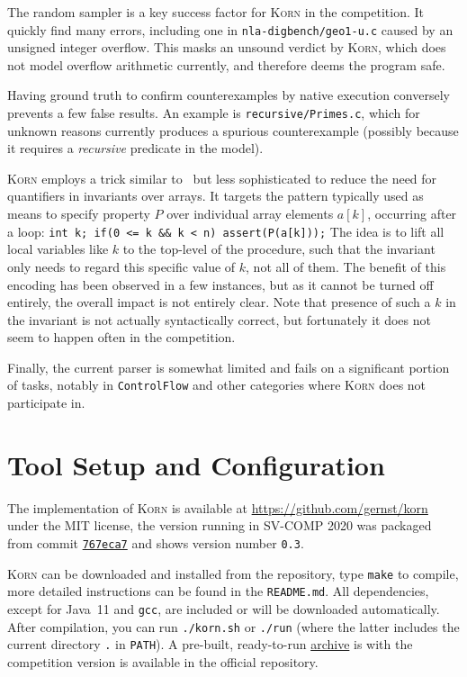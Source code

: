 \documentclass{llncs}
\newcommand{\Korn}{\textsc{Korn}\xspace}
\begin{document}
The random sampler is a key success factor for \Korn in the competition.
It quickly find many errors, including one in \texttt{nla-digbench/geo1-u.c} caused by an unsigned integer overflow.
This masks an unsound verdict by \Korn, which does not model overflow arithmetic currently, and therefore deems the program safe.

Having ground truth to confirm counterexamples by native execution conversely prevents a few false results.
An example is \texttt{recursive/Primes.c}, which for unknown reasons
currently produces a spurious counterexample (possibly because it requires a \emph{recursive} predicate in the model).

\Korn employs a trick similar to~\cite{monniaux2016cell} but less sophisticated
to reduce the need for quantifiers in invariants over arrays.
It targets the pattern typically used as means to specify property $P$ over individual array elements $a[k]$,
occurring after a loop:
\verb|int k; if(0 <= k && k < n) assert(P(a[k]));|
The idea is to lift all local variables like $k$ to the top-level of the procedure,
such that the invariant only needs to regard this specific value of $k$, not all of them.
The benefit of this encoding has been observed in a few instances,
but as it cannot be turned off entirely, the overall impact is not entirely clear.
Note that presence of such a $k$ in the invariant is not actually syntactically correct,
but fortunately it does not seem to happen often in the competition.

Finally, the current parser is somewhat limited and fails on a significant portion of tasks,
notably in \texttt{ControlFlow} and other categories where \Korn does not participate in.

\section{Tool Setup and Configuration}
\label{sec:project}

The implementation of \Korn is available at
    \url{https://github.com/gernst/korn} under the MIT license,
the version running in SV-COMP 2020 was packaged from commit
\href{https://github.com/gernst/korn/commit/767eca718edf7f04e995142b679762242c68eef5}{\tt 767eca7}
and shows version number \texttt{0.3}.

\Korn can be downloaded and installed from the repository, type \texttt{make} to compile,
more detailed instructions can be found in the \texttt{README.md}.
All dependencies, except for Java~11 and \texttt{gcc}, are included or will be downloaded automatically.
After compilation, you can run \texttt{./korn.sh} or \texttt{./run}
(where the latter includes the current directory \texttt{.} in \texttt{PATH}).
A pre-built, ready-to-run
\href{https://gitlab.com/gernst/svcomp-archives-2021/-/blob/master/2021/korn.zip}{archive}
is with the competition version is available in the official repository.
\end{document}
